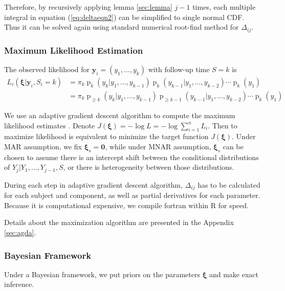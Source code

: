\documentclass[12pt]{article}
\DeclareMathOperator{\pr}{p}
\begin{document}
\begin{itemize}
  Therefore, by recursively applying lemma \ref{sec:lemma} $j-1$
  times, each multiple integral in equation (\ref{eq:deltaeqn2}) can
  be simplified to single normal CDF. Thus it can be solved again
  using standard numerical root-find method for $\Delta_{ij}$.

\end{itemize}

\subsubsection{Maximum Likelihood Estimation}
\label{sec:mle}

The observed likelihood for $\bm y_i = (y_1, \ldots, y_k)$ with
follow-up time $S = k$ is
\begin{align} \label{eq:ll} L_i(\bm \xi| \bm y_i, S_{i} = k) & =
  \pi_k\pr_k (y_k | y_1, \ldots, y_{k-1})
  \pr_k (y_{k-1}|y_1, \ldots, y_{k-2}) \cdots \pr_{k} (y_1) \\
  & = \pi_k \pr_{\geq k} (y_k | y_1, \ldots, y_{k-1}) \pr_{\geq k-1}
  (y_{k-1}|y_1, \ldots, y_{k-2}) \cdots \pr_{k} (y_1) \nonumber
\end{align}

We use an adaptive gradient descent algorithm to compute the maximum
likelihood estimates \citep{ried1993}. Denote $J(\bm \xi) = - \log L =
- \log \sum_{i = 1}^n L_i$.  Then to maximize likelihood is equivalent
to minimize the target function $J(\bm \xi)$. Under MAR assumption, we
fix $\bm \xi_s = \bm 0$, while under MNAR assumption, $\bm \xi_s $ can
be chosen to assume there is an intercept shift between the
conditional distributions of $Y_{j}| Y_{1}, \ldots, Y_{j-1}, S$, or
there is heterogeneity between those distributions.

During each step in adaptive gradient descent algorithm, $\Delta_{ij}$
has to be calculated for each subject and component, as well as
partial derivatives for each parameter. Because it is computational
expensive, we compile fortran within R for speed.

Details about the maximization algorithm are presented in the Appendix
\ref{sec:agda}.

\subsubsection{Bayesian Framework}
\label{sec:bayesian}

Under a Bayesian framework, we  put priors on the parameters
$\bm \xi$ and make exact inference.
\end{document}
